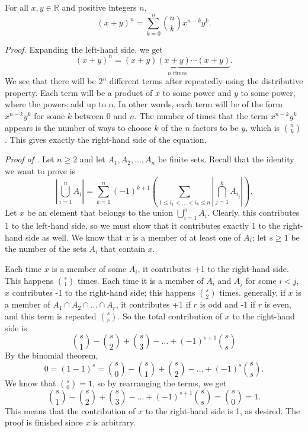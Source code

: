 \documentclass{tufte-handout}
\begin{document}
\begin{Theorem}
    For all \( x,y\in \mathbb{R} \) and positive integers \( n \),
    \[(x+y)^n = \sum_{k=0}^{n}\binom{n}{k}x^{n-k}y^k.\]
\end{Theorem}

\textit{Proof.} Expanding the left-hand side, we get
\[(x+y)^n = \underbrace{(x+y)(x+y)\cdots(x+y)}_{n \text{ times}}.\]
We see that there will be \( 2^n \) different terms after repeatedly using the
distributive property. Each term will be a product of \( x \) to some power and
\( y \) to some power, where the powers add up to n. In other words, each term
will be of the form \( x^{n-k}y^k \) for some \( k \) between 0 and \( n \).
The number of times that the term \( x^{n-k}y^k \) appears is the number of ways
to choose \( k \) of the \( n \) factors to be \( y \), which is \( \binom{n}{k} \).
This gives exactly the right-hand side of the equation. \qedsymbol

\textit{Proof of .}
Let \( n \geq 2 \) and let \( A_1, A_2, \ldots , A_n \) be finite sets. Recall that
the identity we want to prove is 
\[\left|\bigcup_{i=1}^{n}A_i\right| = \sum_{k=1}^{n}(-1)^{k+1}\left(\sum_{1\leq i_1 < \ldots < i_k \leq n}\left|\bigcap_{j=1}^{k}A_{i_j}\right|\right).\]
Let \( x \) be an element that belongs to the union \( \bigcup_{i=1}^{n} A_i\). Clearly, this contributes
1 to the left-hand side, so we must show that it contributes exactly 1 to the right-hand side as well.
We know that \( x \) is a member of at least one of \( A_i \); let \( s\geq 1 \)
be the number of the sets \( A_i \) that contain \( x \).

Each time \( x \) is a member of some \( A_i \), it contributes +1 to the right-hand side.
This happens \( \binom{s}{1} \) times. Each time it is a member of \( A_i \) and \( A_j \) for some \( i < j \),
\( x \) contributes -1 to the right-hand side; this happens \( \binom{s}{2} \) times. generally,
if \( x \) is a member of \( A_1 \cap A_2 \cap \ldots \cap A_r \), it contributes +1 if \( r \) is odd
and -1 if \( r \) is even, and this term is repeated \( \binom{s}{r} \). 
So the total contribution of \( x \) to the right-hand side is
\[\binom{s}{1} - \binom{s}{2} + \binom{s}{3} - \ldots + (-1)^{s+1}\binom{s}{s}\]
By the binomial theorem, 
\[ 0 = (1-1)^s = \binom{s}{0} - \binom{s}{1} + \binom{s}{2} - \ldots + (-1)^s\binom{s}{s}.\]
We know that \( \binom{s}{0} = 1 \), so by rearranging the terms, we get
\[\binom{s}{1} - \binom{s}{2} + \binom{s}{3} - \ldots + (-1)^{s+1}\binom{s}{s} =\binom{s}{0} = 1.\]
This means that the contribution of \( x \) to the right-hand side is 1, as desired. 
The proof is finished since \( x \) is arbitrary.\qedsymbol
\end{document}
